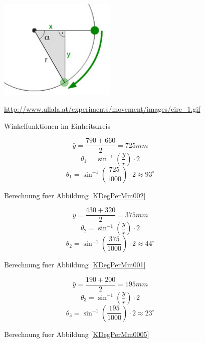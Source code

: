 \documentclass{article}
\begin{document}
\begin{figure}
  \centering
  \includegraphics[width=0.5\textwidth]{img/Winkelfunktionen_einheitskreis.jpg}               
  \caption{Winkelfunktionen im Einheitskreis }\url{http://www.ullala.at/experiments/movement/images/circ_1.gif}
  \label{Winkelfunktionen}
\end{figure}

\begin{figure}
	\begin{equation}\label{getY}	
		\bar{y}=\frac{790+660}{2}=725mm
	\end{equation}
	\begin{equation}\label{getX}	
		\theta_1=\sin^{-1} \left( \frac{y}{r} \right) \cdot 2
	\end{equation}
	\begin{equation}\label{theta1}	
		\theta_1=\sin^{-1}\left(\frac{725}{1000} \right) \cdot 2 \approx 93^\circ
	\end{equation}	
  \caption{Berechnung fuer Abbildung \ref{KDegPerMm002}}
  \label{KDegPerMm002Calc}
\end{figure}

\begin{figure}
	\begin{equation}\label{get001Y}	
		\bar{y}=\frac{430+320}{2}=375mm
	\end{equation}
	\begin{equation}\label{get001X}	
		\theta_2=\sin^{-1} \left( \frac{y}{r} \right) \cdot 2
	\end{equation}
	\begin{equation}\label{theta2}	
		\theta_2=\sin^{-1} \left( \frac{375}{1000} \right) \cdot 2 \approx 44^\circ
	\end{equation}	
  \caption{Berechnung fuer Abbildung \ref{KDegPerMm001}}
  \label{KDegPerMm001Calc}
\end{figure}

\begin{figure}
	\begin{equation}\label{get0005Y}	
		\bar{y}=\frac{190+200}{2}=195mm
	\end{equation}
	\begin{equation}\label{get0005X}	
		\theta_3=\sin^{-1} \left( \frac{y}{r} \right) \cdot 2
	\end{equation}
	\begin{equation}\label{theta3}	
		\theta_3=\sin^{-1} \left( \frac{195}{1000} \right) \cdot 2 \approx 23^\circ
	\end{equation}
  \caption{Berechnung fuer Abbildung \ref{KDegPerMm0005}}
  \label{KDegPerMm0005Calc}
\end{figure}
\end{document}
